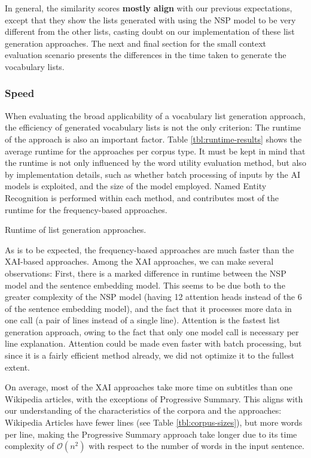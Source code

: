 In general, the similarity scores \textbf{mostly align} with our previous expectations, except that they show the lists generated with using the NSP model to be very different from the other lists, casting doubt on our implementation of these list generation approaches.
The next and final section for the small context evaluation scenario presents the differences in the time taken to generate the vocabulary lists.

\subsubsection{Speed} \label{sec:eval-speed}
When evaluating the broad applicability of a vocabulary list generation approach, the efficiency of generated vocabulary lists is not the only criterion:
The runtime of the approach is also an important factor.
Table \ref{tbl:runtime-results} shows the average runtime for the approaches per corpus type.
It must be kept in mind that the runtime is not only influenced by the word utility evaluation method, but also by implementation details, such as whether batch processing of inputs by the AI models is exploited, and the size of the model employed.
Named Entity Recognition is performed within each method, and contributes most of the runtime for the frequency-based approaches.

\begin{table}[ht]
	\centering
	
	\caption{Runtime of list generation approaches.}
	\label{tbl:runtime-results}
\end{table}

As is to be expected, the frequency-based approaches are much faster than the XAI-based approaches.
Among the XAI approaches, we can make several observations:
First, there is a marked difference in runtime between the NSP model and the sentence embedding model.
This seems to be due both to the greater complexity of the NSP model (having 12 attention heads instead of the 6 of the sentence embedding model), and the fact that it processes more data in one call (a pair of lines instead of a single line).
Attention is the fastest list generation approach, owing to the fact that only one model call is necessary per line explanation.
Attention could be made even faster with batch processing, but since it is a fairly efficient method already, we did not optimize it to the fullest extent.

On average, most of the XAI approaches take more time on subtitles than one Wikipedia articles, with the exceptions of Progressive Summary.
This aligns with our understanding of the characteristics of the corpora and the approaches:
Wikipedia Articles have fewer lines (see Table \ref{tbl:corpus-sizes}), but more words per line, making the Progressive Summary approach take longer due to its time complexity of $\mathcal{O}(n^2)$ with respect to the number of words in the input sentence.

